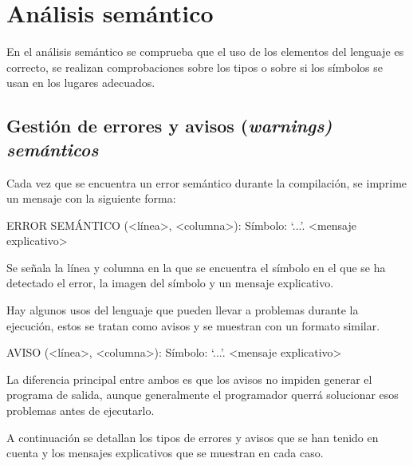 \section{Análisis semántico}
En el análisis semántico se comprueba que el uso de los elementos del lenguaje es correcto, se realizan comprobaciones sobre los tipos o sobre si los símbolos se usan en los lugares adecuados.

\subsection{Gestión de errores y avisos (\it{warnings}) semánticos}
Cada vez que se encuentra un error semántico durante la compilación, se imprime un mensaje con la siguiente forma:

\begin{codigo}
ERROR SEMÁNTICO (<línea>, <columna>): Símbolo: `...'. <mensaje explicativo>
\end{codigo}

Se señala la línea y columna en la que se encuentra el símbolo en el que se ha detectado el error, la imagen del símbolo y un mensaje explicativo.

Hay algunos usos del lenguaje que pueden llevar a problemas durante la ejecución, estos se tratan como avisos y se muestran con un formato similar.

\begin{codigo}
AVISO (<línea>, <columna>): Símbolo: `...'. <mensaje explicativo>
\end{codigo}

La diferencia principal entre ambos es que los avisos no impiden generar el programa de salida, aunque generalmente el programador querrá solucionar esos problemas antes de ejecutarlo.

A continuación se detallan los tipos de errores y avisos que se han tenido en cuenta y los mensajes explicativos que se muestran en cada caso.


